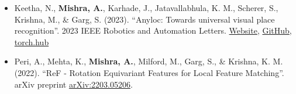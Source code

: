     \begin{itemize}
        \setlength{\itemsep}{0mm}
        \item Keetha, N., {\bf Mishra, A.}, Karhade, J., Jatavallabhula, K.
            M., Scherer, S., Krishna, M., \& Garg, S. (2023). ``Anyloc:
            Towards universal visual place recognition''. 2023 IEEE
            Robotics and Automation Letters.
            \href{https://anyloc.github.io/}{Website},
            \href{https://github.com/AnyLoc/AnyLoc}{GitHub},
            \href{https://github.com/AnyLoc/DINO}{torch.hub}
        \item Peri, A., Mehta, K., {\bf Mishra, A.}, Milford, M., Garg, S., 
            \& Krishna, K. M. (2022). ``ReF - Rotation Equivariant 
            Features for Local Feature Matching''. arXiv preprint 
            \href{https://arxiv.org/abs/2203.05206}{arXiv:2203.05206}.
    \end{itemize}


